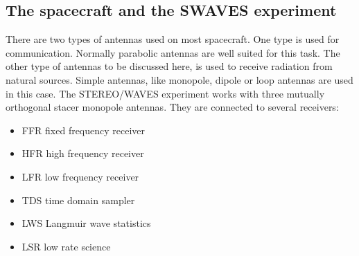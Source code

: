 \documentclass[galley,ras]{agu2001}
\begin{document}
\begin{article}
%
%


%
%



\section{The spacecraft and the SWAVES experiment}
There are two types of antennas used on most spacecraft. One type is used for communication. Normally parabolic antennas are well suited for this task. The other type of antennas to be discussed here, is used to receive radiation from natural sources. Simple antennas, like monopole, dipole or loop antennas are used in this case. The STEREO/WAVES experiment works with three mutually orthogonal stacer monopole antennas. They are connected to several receivers:\\

\begin{itemize}
    \item FFR   fixed frequency receiver\\
\item HFR   high frequency receiver\\
\item LFR   low frequency receiver\\
\item TDS   time domain sampler\\
\item LWS   Langmuir wave statistics\\
\item LSR   low rate science\\
\end{itemize}


\end{article}
\end{document}
